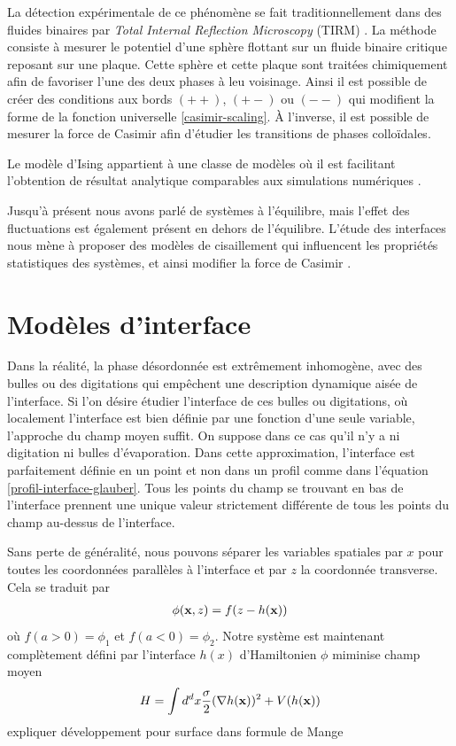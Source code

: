 La détection expérimentale de ce phénomène se fait traditionnellement dans des fluides binaires par \textit{Total Internal Reflection Microscopy} (TIRM) \cite{fukuto_critical_2005,hertlein_direct_2008,gambassi_critical_2009,edison_critical_2015-1}. La méthode consiste à mesurer le potentiel d'une sphère flottant sur un fluide binaire critique reposant sur une plaque. Cette sphère et cette plaque sont traitées chimiquement afin de favoriser l'une des deux phases à leu voisinage. Ainsi il est possible de créer des conditions aux bords $(++)$, $(+-)$ ou $(--)$ qui modifient la forme de la fonction universelle \ref{casimir-scaling}. À l'inverse, il est possible de mesurer la force de Casimir \cite{nguyen_controlling_2013} afin d'étudier les transitions de phases colloïdales.

Le modèle d'Ising appartient à une classe de modèles où il est facilitant l'obtention de résultat analytique \cite{hobrecht_critical_2017} comparables aux simulations numériques \cite{vasilyev_monte_2007,vasilyev_universal_2009,cardozo_finite_2015}.

Jusqu'à présent nous avons parlé de systèmes à l'équilibre, mais l'effet des fluctuations est également présent en dehors de l'équilibre. L'étude des interfaces nous mène à proposer des modèles de cisaillement qui influencent les propriétés statistiques des systèmes, et ainsi modifier la force de Casimir \cite{dean_out--equilibrium_2010}.

    \section{Modèles d'interface}

Dans la réalité, la phase désordonnée est extrêmement inhomogène, avec des bulles ou des digitations qui empêchent une description dynamique aisée de l'interface. Si l'on désire étudier l'interface de ces bulles ou digitations, où localement l'interface est bien définie par une fonction d'une seule variable, l'approche du champ moyen suffit. On suppose dans ce cas qu'il n'y a ni digitation ni bulles d'évaporation. Dans cette approximation, l'interface est parfaitement définie en un point et non dans un profil comme dans l'équation \ref{profil-interface-glauber}. Tous les points du champ se trouvant en bas de l'interface prennent une unique valeur strictement différente de tous les points du champ au-dessus de l'interface. 

Sans perte de généralité, nous pouvons séparer les variables spatiales par $x$ pour toutes les coordonnées parallèles à l'interface et par $z$ la coordonnée transverse. Cela se traduit par
\begin{align}
    \phi({\bf x},z) = f(z-h({\bf x}))
    \label{capillary-wave-theory}
\end{align}
où $f(a \greater 0) = \phi_1$ et $f(a \less 0) = \phi_2$. Notre système est maintenant complètement défini par l'interface $h(x)$ d'Hamiltonien
{\color{red} $\phi$ miminise champ moyen }
\begin{align}
    H = \int d^d x \frac{\sigma}{2} (\nabla h({\bf x}))^2 + V(h({\bf x}))
    \label{hamil-cwt}
\end{align}
{\color{red} expliquer développement pour surface dans formule de Mange}

